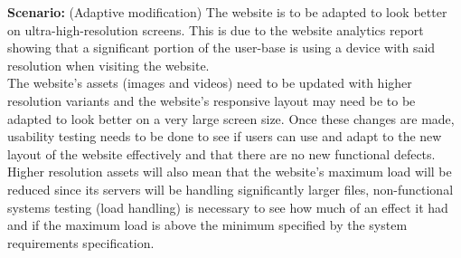 \documentclass[a4paper,man,natbib]{apa6}
\begin{document}
\textbf{Scenario:} (Adaptive modification) The website is to be adapted to look better on ultra-high-resolution screens. This is due to the website analytics report showing that a significant portion of the user-base is using a device with said resolution when visiting the website.\\

The website's assets (images and videos) need to be updated with higher resolution variants and the website's responsive layout may need be to be adapted to look better on a very large screen size. Once these changes are made, usability testing needs to be done to see if users can use and adapt to the new layout of the website effectively and that there are no new functional defects.\\

Higher resolution assets will also mean that the website's maximum load will be reduced since its servers will be handling significantly larger files, non-functional systems testing (load handling) is necessary to see how much of an effect it had and if the maximum load is above the minimum specified by the system requirements specification.\\


\end{document}
